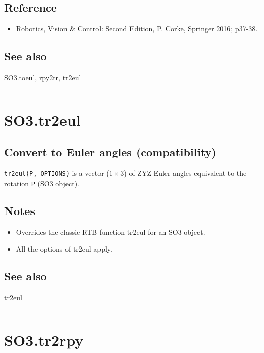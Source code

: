 \subsection*{Reference}
\begin{itemize}
  \item Robotics, Vision \& Control: Second Edition, P. Corke, Springer 2016; p37-38.
\end{itemize}

\subsection*{See also}


\hyperlink{SO3.toeul}{\color{blue} SO3.toeul}, \hyperlink{rpy2tr}{\color{blue} rpy2tr}, \hyperlink{tr2eul}{\color{blue} tr2eul}

\vspace{1.5ex}\hrule

\hypertarget{SO3.tr2eul}{\section*{SO3.tr2eul}}
\subsection*{Convert to Euler angles (compatibility)}


\texttt{tr2eul(P, OPTIONS)} is a vector ($1 \times 3$) of ZYZ Euler angles
equivalent to the rotation \texttt{P} (SO3 object).


\subsection*{Notes}
\begin{itemize}
  \item Overrides the classic RTB function tr2eul for an SO3 object.
  \item All the options of tr2eul apply.
\end{itemize}

\subsection*{See also}


\hyperlink{tr2eul}{\color{blue} tr2eul}

\vspace{1.5ex}\hrule

\hypertarget{SO3.tr2rpy}{\section*{SO3.tr2rpy}}
